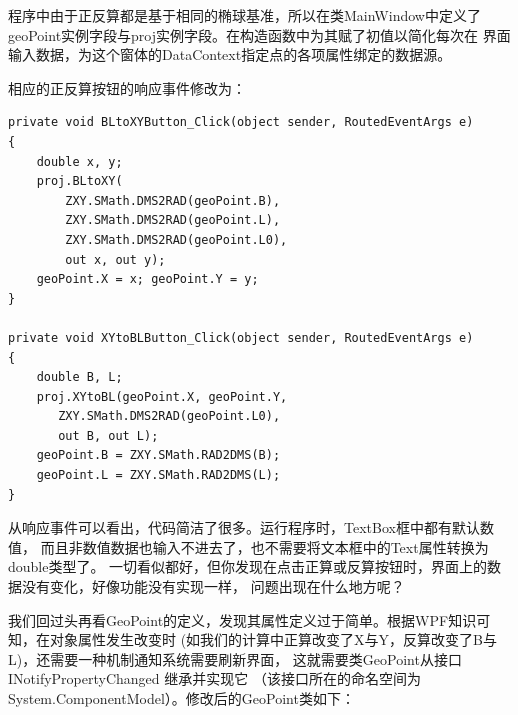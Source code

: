 程序中由于正反算都是基于相同的椭球基准，所以在类MainWindow中定义了
geoPoint实例字段与proj实例字段。在构造函数中为其赋了初值以简化每次在
界面输入数据，为这个窗体的DataContext指定点的各项属性绑定的数据源。

相应的正反算按钮的响应事件修改为：

\begin{lstlisting}
private void BLtoXYButton_Click(object sender, RoutedEventArgs e)
{
    double x, y;
    proj.BLtoXY(
        ZXY.SMath.DMS2RAD(geoPoint.B),
        ZXY.SMath.DMS2RAD(geoPoint.L),
        ZXY.SMath.DMS2RAD(geoPoint.L0),
        out x, out y);
    geoPoint.X = x; geoPoint.Y = y;
}

private void XYtoBLButton_Click(object sender, RoutedEventArgs e)
{
    double B, L;
    proj.XYtoBL(geoPoint.X, geoPoint.Y,
       ZXY.SMath.DMS2RAD(geoPoint.L0),
       out B, out L);
    geoPoint.B = ZXY.SMath.RAD2DMS(B);
    geoPoint.L = ZXY.SMath.RAD2DMS(L);
}
\end{lstlisting}

从响应事件可以看出，代码简洁了很多。运行程序时，TextBox框中都有默认数值，
而且非数值数据也输入不进去了，也不需要将文本框中的Text属性转换为double类型了。
一切看似都好，但你发现在点击正算或反算按钮时，界面上的数据没有变化，好像功能没有实现一样，
问题出现在什么地方呢？

我们回过头再看GeoPoint的定义，发现其属性定义过于简单。根据WPF知识可知，在对象属性发生改变时
(如我们的计算中正算改变了X与Y，反算改变了B与L)，还需要一种机制通知系统需要刷新界面，
这就需要类GeoPoint从接口 INotifyPropertyChanged 继承并实现它
（该接口所在的命名空间为System.ComponentModel）。修改后的GeoPoint类如下：

